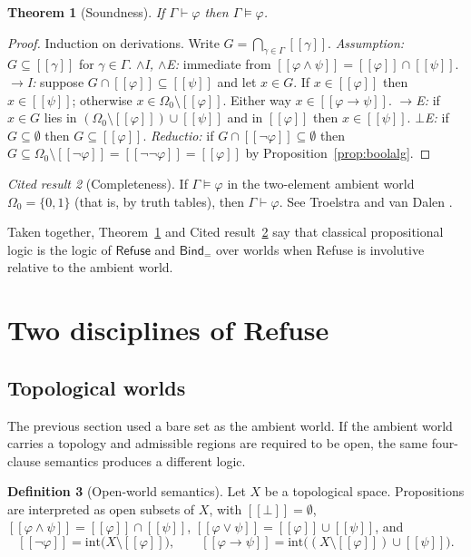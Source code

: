 \documentclass[11pt]{article}
\newcommand{\Refuse}{\mathsf{Refuse}}
\newcommand{\Bind}{\mathsf{Bind}}
\newcommand{\Om}{\Omega}
\newcommand{\sem}[1]{[\![#1]\!]}
\theoremstyle{definition}
\newtheorem{definition}{Definition}[section]
\theoremstyle{plain}
\newtheorem{theorem}[definition]{Theorem}
\theoremstyle{remark}
\newtheorem{cited}[definition]{Cited result}
\begin{document}
\begin{theorem}[Soundness]\label{thm:sound}
If $\Gamma\vdash\varphi$ then $\Gamma\models\varphi$.
\end{theorem}
\begin{proof}
Induction on derivations. Write $G=\bigcap_{\gamma\in\Gamma}\sem\gamma$.
\emph{Assumption:} $G\subseteq\sem\gamma$ for $\gamma\in\Gamma$.
\emph{$\wedge$I, $\wedge$E:} immediate from $\sem{\varphi\wedge\psi}=\sem\varphi\cap\sem\psi$.
\emph{$\to$I:} suppose $G\cap\sem\varphi\subseteq\sem\psi$ and let $x\in G$. If $x\in\sem\varphi$ then $x\in\sem\psi$; otherwise $x\in\Om_0\setminus\sem\varphi$. Either way $x\in\sem{\varphi\to\psi}$.
\emph{$\to$E:} if $x\in G$ lies in $(\Om_0\setminus\sem\varphi)\cup\sem\psi$ and in $\sem\varphi$ then $x\in\sem\psi$.
\emph{$\bot$E:} if $G\subseteq\emptyset$ then $G\subseteq\sem\varphi$.
\emph{Reductio:} if $G\cap\sem{\neg\varphi}\subseteq\emptyset$ then $G\subseteq\Om_0\setminus\sem{\neg\varphi}=\sem{\neg\neg\varphi}=\sem\varphi$ by Proposition~\ref{prop:boolalg}.
\end{proof}

\begin{cited}[Completeness]\label{cit:complete}
If $\Gamma\models\varphi$ in the two-element ambient world $\Om_0=\{0,1\}$ (that is, by truth tables), then $\Gamma\vdash\varphi$. See Troelstra and van Dalen \cite[Ch.~2]{TvD88}.
\end{cited}

Taken together, Theorem~\ref{thm:sound} and Cited result~\ref{cit:complete} say that classical propositional logic is the logic of $\Refuse$ and $\Bind_=$ over worlds when Refuse is involutive relative to the ambient world.

\section{Two disciplines of Refuse}\label{sec:heyting}

\subsection{Topological worlds}

The previous section used a bare set as the ambient world. If the ambient world carries a topology and admissible regions are required to be open, the same four-clause semantics produces a different logic.

\begin{definition}[Open-world semantics]\label{def:opensem}
Let $X$ be a topological space. Propositions are interpreted as open subsets of $X$, with $\sem\bot=\emptyset$, $\sem{\varphi\wedge\psi}=\sem\varphi\cap\sem\psi$, $\sem{\varphi\vee\psi}=\sem\varphi\cup\sem\psi$, and
\[
\sem{\neg\varphi}=\mathrm{int}\big(X\setminus\sem\varphi\big),\qquad
\sem{\varphi\to\psi}=\mathrm{int}\big((X\setminus\sem\varphi)\cup\sem\psi\big).
\]
\end{definition}
\end{document}
